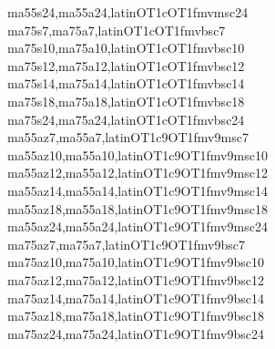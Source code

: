         {ma55s24,ma55a24,latin}{OT1c}{OT1}{fmv}{m}{sc}{24}
        {ma75s7,ma75a7,latin}{OT1c}{OT1}{fmv}{b}{sc}{7}
        {ma75s10,ma75a10,latin}{OT1c}{OT1}{fmv}{b}{sc}{10}
        {ma75s12,ma75a12,latin}{OT1c}{OT1}{fmv}{b}{sc}{12}
        {ma75s14,ma75a14,latin}{OT1c}{OT1}{fmv}{b}{sc}{14}
        {ma75s18,ma75a18,latin}{OT1c}{OT1}{fmv}{b}{sc}{18}
        {ma75s24,ma75a24,latin}{OT1c}{OT1}{fmv}{b}{sc}{24}
        {ma55az7,ma55a7,latin}{OT1c9}{OT1}{fmv9}{m}{sc}{7}
        {ma55az10,ma55a10,latin}{OT1c9}{OT1}{fmv9}{m}{sc}{10}
        {ma55az12,ma55a12,latin}{OT1c9}{OT1}{fmv9}{m}{sc}{12}
        {ma55az14,ma55a14,latin}{OT1c9}{OT1}{fmv9}{m}{sc}{14}
        {ma55az18,ma55a18,latin}{OT1c9}{OT1}{fmv9}{m}{sc}{18}
        {ma55az24,ma55a24,latin}{OT1c9}{OT1}{fmv9}{m}{sc}{24}
        {ma75az7,ma75a7,latin}{OT1c9}{OT1}{fmv9}{b}{sc}{7}
        {ma75az10,ma75a10,latin}{OT1c9}{OT1}{fmv9}{b}{sc}{10}
        {ma75az12,ma75a12,latin}{OT1c9}{OT1}{fmv9}{b}{sc}{12}
        {ma75az14,ma75a14,latin}{OT1c9}{OT1}{fmv9}{b}{sc}{14}
        {ma75az18,ma75a18,latin}{OT1c9}{OT1}{fmv9}{b}{sc}{18}
        {ma75az24,ma75a24,latin}{OT1c9}{OT1}{fmv9}{b}{sc}{24}
\endinstallfonts

\bye

